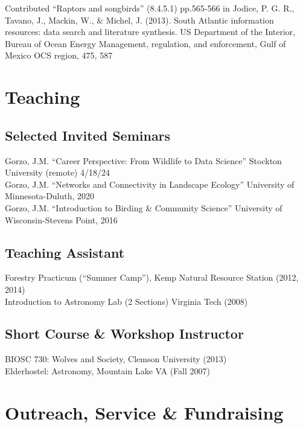 \documentclass[11pt,a4paper,]{awesome-cv}
\begin{document}
Contributed ``Raptors and songbirds'' (8.4.5.1) pp.565-566 in Jodice, P.
G. R., Tavano, J., Mackin, W., \& Michel, J. (2013). South Atlantic
information resources: data search and literature synthesis. US
Department of the Interior, Bureau of Ocean Energy Management,
regulation, and enforcement, Gulf of Mexico OCS region, 475, 587

\section{Teaching}\label{teaching}

\subsection{Selected Invited Seminars}\label{selected-invited-seminars}

Gorzo, J.M. ``Career Perspective: From Wildlife to Data Science''
Stockton University (remote) 4/18/24\\
Gorzo, J.M. ``Networks and Connectivity in Landscape Ecology''
University of Minnesota-Duluth, 2020\\
Gorzo, J.M. ``Introduction to Birding \& Community Science'' University
of Wisconsin-Stevens Point, 2016

\subsection{Teaching Assistant}\label{teaching-assistant}

Forestry Practicum (``Summer Camp''), Kemp Natural Resource Station
(2012, 2014)\\
Introduction to Astronomy Lab (2 Sections) Virginia Tech (2008)

\subsection{Short Course \& Workshop
Instructor}\label{short-course-workshop-instructor}

BIOSC 730: Wolves and Society, Clemson University (2013)\\
Elderhostel: Astronomy, Mountain Lake VA (Fall 2007)

\section{Outreach, Service \&
Fundraising}\label{outreach-service-fundraising}
\end{document}
